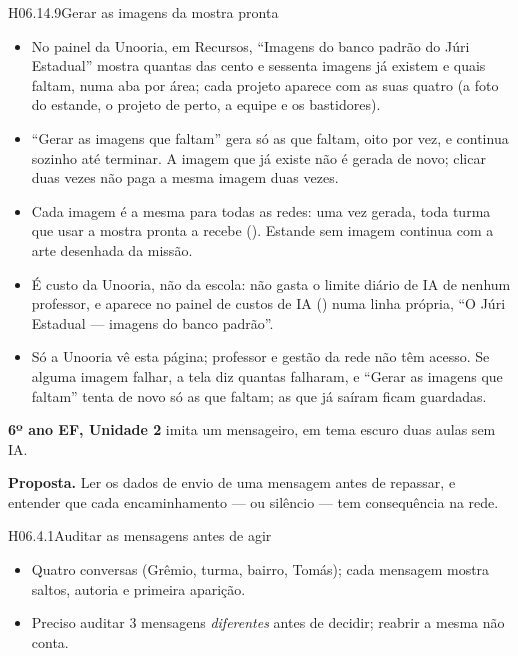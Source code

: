 \begin{historia}{H06.14.9}{Gerar as imagens da mostra pronta}{\pronto}
\aceite
\begin{itemize}
  \item No painel da Unooria, em Recursos, \enquote{Imagens do banco padrão
    do Júri Estadual} mostra quantas das cento e sessenta imagens já existem e
    quais faltam, numa aba por área; cada projeto aparece com as suas quatro
    (a foto do estande, o projeto de perto, a equipe e os bastidores).
  \item \enquote{Gerar as imagens que faltam} gera só as que faltam, oito
    por vez, e continua sozinho até terminar. A imagem que já existe não é
    gerada de novo; clicar duas vezes não paga a mesma imagem duas vezes.
  \item Cada imagem é a mesma para todas as redes: uma vez gerada, toda turma
    que usar a mostra pronta a recebe (). Estande sem imagem
    continua com a arte desenhada da missão.
  \item É custo da Unooria, não da escola: não gasta o limite diário de IA de
    nenhum professor, e aparece no painel de custos de IA () numa
    linha própria, \enquote{O Júri Estadual --- imagens do banco padrão}.
  \item Só a Unooria vê esta página; professor e gestão da rede não têm
    acesso. Se alguma imagem falhar, a tela diz quantas falharam, e
    \enquote{Gerar as imagens que faltam} tenta de novo só as que faltam; as
    que já saíram ficam guardadas.
\end{itemize}
\end{historia}



\textbf{6º ano EF, Unidade 2} \textperiodcentered{} imita um mensageiro, em
tema escuro \textperiodcentered{} duas aulas \textperiodcentered{} sem IA.

\textbf{Proposta.} Ler os dados de envio de uma mensagem antes de repassar, e
entender que cada encaminhamento --- ou silêncio --- tem consequência na rede.

\begin{historia}{H06.4.1}{Auditar as mensagens antes de agir}{\pronto}
\aceite
\begin{itemize}
  \item Quatro conversas (Grêmio, turma, bairro, Tomás); cada mensagem mostra
    saltos, autoria e primeira aparição.
  \item Preciso auditar 3 mensagens \emph{diferentes} antes de decidir;
    reabrir a mesma não conta.
\end{itemize}
\end{historia}

